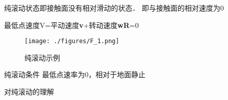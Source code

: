 
纯滚动状态即接触面没有相对滑动的状态．
即与接触面的相对速度为0

最低点速度V=平动速度\textbf{v}+转动速度\textbf{wR}=0
\begin{figure}[ht]
\centering
\texttt{[image: ./figures/F\_1.png]}
\caption{纯滚动示例} \label{F_fig1}
\end{figure}

纯滚动条件
最低点速率为0，相对于地面静止


对纯滚动的理解
